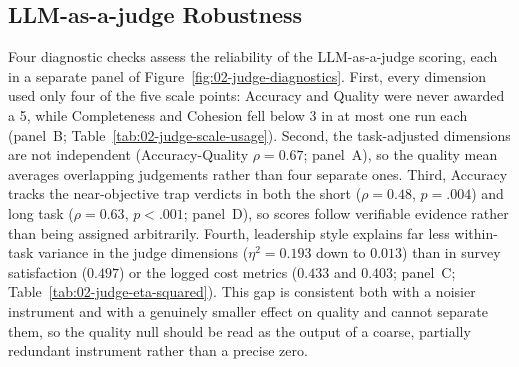 \subsection{LLM-as-a-judge Robustness}
\label{subsec:judge-robustness}

Four diagnostic checks assess the reliability of the \ac{LLM}-as-a-judge scoring, each in a separate panel of Figure~\ref{fig:02-judge-diagnostics}.
First, every dimension used only four of the five scale points: 
Accuracy and Quality were never awarded a 5, while Completeness and Cohesion fell below 3 in at most one run each (panel~B; Table~\ref{tab:02-judge-scale-usage}).
Second, the task-adjusted dimensions are not independent (Accuracy-Quality $\rho = 0.67$; panel~A), so the quality mean averages overlapping judgements rather than four separate ones.
Third, Accuracy tracks the near-objective trap verdicts in both the short ($\rho = 0.48$, $p = .004$) and long task ($\rho = 0.63$, $p < .001$; panel~D), so scores follow verifiable evidence rather than being assigned arbitrarily.
Fourth, leadership style explains far less within-task variance in the judge dimensions ($\eta^2 = 0.193$ down to $0.013$) than in survey satisfaction ($0.497$) or the logged cost metrics ($0.433$ and $0.403$; panel~C; Table~\ref{tab:02-judge-eta-squared}).
This gap is consistent both with a noisier instrument and with a genuinely smaller effect on quality and cannot separate them, so the quality null should be read as the output of a coarse, partially redundant instrument rather than a precise zero.
